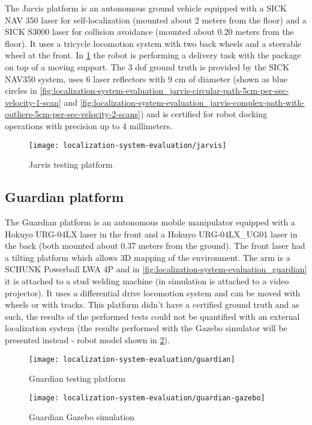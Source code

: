 The Jarvis platform is an autonomous ground vehicle equipped with a SICK NAV 350 laser for self-localization (mounted about 2 meters from the floor) and a SICK S3000 laser for collision avoidance (mounted about 0.20 meters from the floor). It uses a tricycle locomotion system with two back wheels and a steerable wheel at the front. In \cref{fig:localization-system-evaluation_jarvis} the robot is performing a delivery task with the package on top of a moving support. The 3 \gls{dof} ground truth is provided by the SICK NAV350 system, uses 6 laser reflectors with 9 cm of diameter (shown as blue circles in \cref{fig:localization-system-evaluation_jarvis-circular-path-5cm-per-sec-velocity-1-scan} and \cref{fig:localization-system-evaluation_jarvis-complex-path-with-outliers-5cm-per-sec-velocity-2-scans}) and is certified for robot docking operations with precision up to 4 millimeters.

\begin{figure}[H]
	\centering
	\texttt{[image: localization-system-evaluation/jarvis]}
	\caption{Jarvis testing platform}
	\label{fig:localization-system-evaluation_jarvis}
\end{figure}


\subsection{Guardian platform}

The Guardian platform is an autonomous mobile manipulator equipped with a Hokuyo URG-04LX laser in the front and a Hokuyo URG-04LX\_UG01 laser in the back (both mounted about 0.37 meters from the ground). The front laser had a tilting platform which allows 3D mapping of the environment. The arm is a SCHUNK Powerball LWA 4P and in \cref{fig:localization-system-evaluation_guardian} it is attached to a stud welding machine (in simulation is attached to a video projector). It uses a differential drive locomotion system and can be moved with wheels or with tracks. This platform didn't have a certified ground truth and as such, the results of the performed tests could not be quantified with an external localization system (the results performed with the Gazebo simulator will be presented instead - robot model shown in \cref{fig:localization-system-evaluation_guardian_gazebo}).

\begin{figure}
	\centering
	\begin{minipage}[h]{0.497\textwidth}
		\centering
		\texttt{[image: localization-system-evaluation/guardian]}
		\caption{Guardian testing platform}
		\label{fig:localization-system-evaluation_guardian}
	\end{minipage}\hfill
	\begin{minipage}[h]{0.497\textwidth}
		\centering
		\texttt{[image: localization-system-evaluation/guardian-gazebo]}
		\caption{Guardian Gazebo simulation}
		\label{fig:localization-system-evaluation_guardian_gazebo}
	\end{minipage}
\end{figure}


